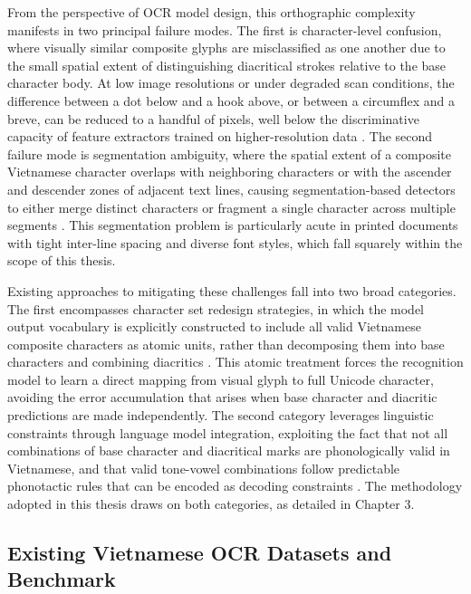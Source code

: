 From the perspective of OCR model design, this orthographic complexity manifests in two principal failure modes. The first is character-level confusion, where visually similar composite glyphs are misclassified as one another due to the small spatial extent of distinguishing diacritical strokes relative to the base character body. At low image resolutions or under degraded scan conditions, the difference between a dot below and a hook above, or between a circumflex and a breve, can be reduced to a handful of pixels, well below the discriminative capacity of feature extractors trained on higher-resolution data \cite{Nguyen2021}. The second failure mode is segmentation ambiguity, where the spatial extent of a composite Vietnamese character overlaps with neighboring characters or with the ascender and descender zones of adjacent text lines, causing segmentation-based detectors to either merge distinct characters or fragment a single character across multiple segments \cite{Nguyen2021}. This segmentation problem is particularly acute in printed documents with tight inter-line spacing and diverse font styles, which fall squarely within the scope of this thesis.

Existing approaches to mitigating these challenges fall into two broad categories. The first encompasses character set redesign strategies, in which the model output vocabulary is explicitly constructed to include all valid Vietnamese composite characters as atomic units, rather than decomposing them into base characters and combining diacritics \cite{Nguyen2021}. This atomic treatment forces the recognition model to learn a direct mapping from visual glyph to full Unicode character, avoiding the error accumulation that arises when base character and diacritic predictions are made independently. The second category leverages linguistic constraints through language model integration, exploiting the fact that not all combinations of base character and diacritical marks are phonologically valid in Vietnamese, and that valid tone-vowel combinations follow predictable phonotactic rules that can be encoded as decoding constraints \cite{Nguyen2021}. The methodology adopted in this thesis draws on both categories, as detailed in Chapter 3.

\subsection{Existing Vietnamese OCR Datasets and Benchmark}
\label{sec:existing_vnese_ocr_datasets_and_benchmark}

